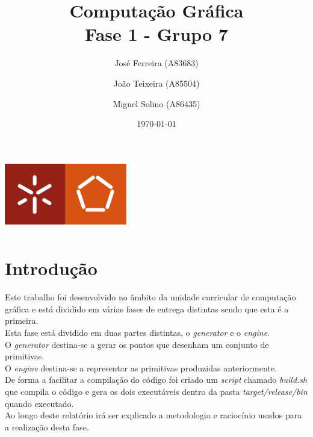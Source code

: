 \documentclass[a4paper]{report}
\begin{document}
\title{Computação Gráfica\\
\large Fase 1 - Grupo 7}
\author{José Ferreira (A83683) \and João Teixeira (A85504) \and Miguel Solino (A86435)}
\date{\today}

\begin{center}
    \begin{minipage}{0.75\linewidth}
        \centering
        \includegraphics[width=0.4\textwidth]{images/eng.jpeg}\par\vspace{1cm}
        \vspace{1.5cm}
        \href{https://www.uminho.pt/PT}
        {\color{black}{\scshape\LARGE Universidade do Minho}} \par
        \vspace{1cm}
        \href{https://www.di.uminho.pt/}
        {\color{black}{\scshape\Large Departamento de Informática}} \par
        \vspace{1.5cm}
        \maketitle
    \end{minipage}
\end{center}

\tableofcontents

\chapter{Introdução}
Este trabalho foi desenvolvido no âmbito da unidade curricular de computação
gráfica e está dividido em várias fases de entrega distintas sendo que esta é a
primeira.\\
Esta fase está dividido em duas partes distintas, o \textit{generator} e o
\textit{engine}.\\
O \textit{generator} destina-se a gerar os pontos que desenham um conjunto de
primitivas.\\
O \textit{engine} destina-se a representar as primitivas produzidas
anteriormente.\\
De forma a facilitar a compilação do código foi criado um \textit{script}
chamado \textit{build.sh} que compila o código e gera os dois executáveis dentro
da pasta \textit{target/release/bin} quando executado.\\
Ao longo deste relatório irá ser explicado a metodologia e raciocínio usados
para a realização desta fase.\\
\end{document}

